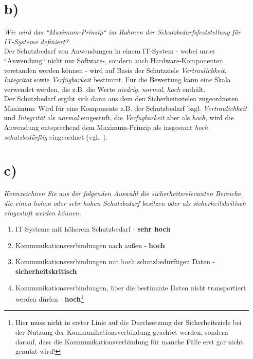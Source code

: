 \section{b)}

\textit{Wie wird das ``Maximum-Prinzip`` im Rahmen der Schutzbedarfsfeststellung für IT-Systeme definiert?}\\

\noindent
Der Schutzbedarf von Anwendungen in einem IT-System - wobei unter ``Anwendung`` nicht nur Software-, sondern auch Hardware-Komponenten verstanden werden können - wird auf Basis der Schutzziele \textit{Vertraulichkeit}, \textit{Integrität} sowie \textit{Verfügbarkeit} bestimmt.
Für die Bewertung kann eine Skala verwendet werden, die z.B. die Werte \textit{niedrig}, \textit{normal}, \textit{hoch} enthält.\\
Der Schutzbedarf ergibt sich dann aus dem den Sicherheitszielen zugeordneten Maximum: Wird für eine Komponente z.B. der Schutzbedarf bzgl. \textit{Vertraulichkeit} und \textit{Integrität} als \textit{normal} eingestuft, die \textit{Verfügbarkeit} aber als \textit{hoch}, wird die Anwendung entsprechend dem Maximum-Prinzip als insgesamt \textit{hoch schutzbedürftig} eingeordnet (vgl.~\cite[114]{BSI200-2}).

\section{c)}

\textit{Kennzeichnen Sie aus der folgenden Auswahl die sicherheitsrelevanten Bereiche,
die einen hohen oder sehr hohen Schutzbedarf besitzen oder als
sicherheitskritisch eingestuft werden können.}\\

\begin{enumerate}
\itemsep0.5em
\item IT-Systeme mit höherem Schutzbedarf - \textbf{sehr hoch}
\item Kommunikationsverbindungen nach außen - \textbf{hoch}
\item Kommunikationsverbindungen mit hoch schutzbedürftigen Daten - \textbf{sicherheitskritisch}
\item Kommunikationsverbindungen, über die bestimmte Daten nicht transportiert werden dürfen - \textbf{hoch}\footnote{Hier muss nicht in erster Linie auf die Durchsetzung der Sicherheitsziele bei der Nutzung der Kommunikationsverbindung geachtet werden, sondern darauf, dass die Kommunikationsverbindung für manche Fälle erst gar nicht genutzt wird!}
\end{enumerate}

